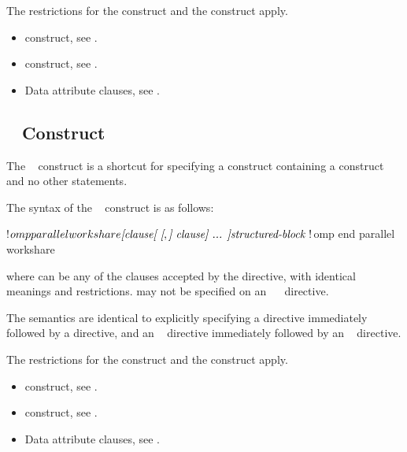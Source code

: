 \restrictions
The restrictions for the  construct and the  
construct apply.

\crossreferences
\begin{itemize}
\item {} construct, see
.

\item {} construct, see
.

\item Data attribute clauses, see
.
\end{itemize}



\begin{fortranspecific}
\subsection{~ Construct}
\label{subsec:parallel workshare Construct}

\summary
The ~ construct is a shortcut for specifying a 
 construct containing a  construct and no 
other statements.

\syntax
The syntax of the ~ construct is as follows:

\begin{ompfPragma}
!$omp parallel workshare \plc{[clause[ [},\plc{] clause] ... ]}
   \plc{structured-block }
!$omp end parallel workshare
\end{ompfPragma}

where  can be any of the clauses accepted by the  
directive, with identical meanings and restrictions.  may not be 
specified on an ~~ directive.

\descr
The semantics are identical to explicitly specifying a  directive 
immediately followed by a  directive, and an 
~ directive immediately followed by an 
~ directive.

\restrictions
The restrictions for the  construct and the  
construct apply.

\crossreferences
\begin{itemize}
\item {} construct, see
.

\item {} construct, see
.

\item Data attribute clauses, see
.
\end{itemize}
\end{fortranspecific}
